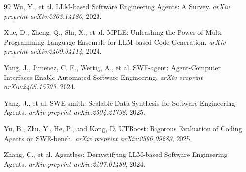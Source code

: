 \documentclass[11pt,a4paper]{article}
\begin{document}
\begin{thebibliography}{99}
Wu, Y., et al.
\newblock LLM-based Software Engineering Agents: A Survey.
\newblock \emph{arXiv preprint arXiv:2303.14180}, 2023.

Xue, D., Zheng, Q., Shi, X., et al.
\newblock MPLE: Unleashing the Power of Multi-Programming Language Ensemble for LLM-based Code Generation.
\newblock \emph{arXiv preprint arXiv:2409.04114}, 2024.

Yang, J., Jimenez, C. E., Wettig, A., et al.
\newblock SWE-agent: Agent-Computer Interfaces Enable Automated Software Engineering.
\newblock \emph{arXiv preprint arXiv:2405.15793}, 2024.

Yang, J., et al.
\newblock SWE-smith: Scalable Data Synthesis for Software Engineering Agents.
\newblock \emph{arXiv preprint arXiv:2504.21798}, 2025.

Yu, B., Zhu, Y., He, P., and Kang, D.
\newblock UTBoost: Rigorous Evaluation of Coding Agents on SWE-bench.
\newblock \emph{arXiv preprint arXiv:2506.09289}, 2025.

Zhang, C., et al.
\newblock Agentless: Demystifying LLM-based Software Engineering Agents.
\newblock \emph{arXiv preprint arXiv:2407.01489}, 2024.

\end{thebibliography}
\end{document}
